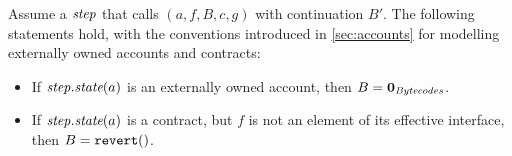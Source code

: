 \begin{example}
Assume a $\mathit{step}$ that calls $(a,f,B,c,g)$ with continuation $B'$. The following statements hold, with the conventions introduced in \autoref{sec:accounts} for modelling externally owned accounts and contracts:
\begin{itemize}
\item If $\mathit{step}.\textit{state}(a)$ is an externally owned account, then $B=\mathbf{0}_{\textit{Bytecodes}}$.
\item If $\mathit{step}.\textit{state}(a)$ is a contract, but $f$ is not an element of its effective interface, then $B=\mathtt{revert}()$. 
\end{itemize}
\end{example}
